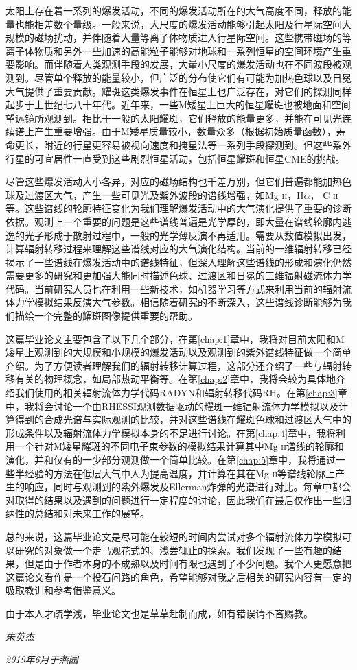 
太阳上存在着一系列的爆发活动，不同的爆发活动所在的大气高度不同，释放的能量也能相差数个量级。一般来说，大尺度的爆发活动能够引起太阳及行星际空间大规模的磁场扰动，并伴随着大量等离子体物质进入行星际空间。这些携带磁场的等离子体物质和另外一些加速的高能粒子能够对地球和一系列恒星的空间环境产生重要影响。而伴随着人类观测手段的发展，大量小尺度的爆发活动也在不同波段被观测到。尽管单个释放的能量较小，但广泛的分布使它们有可能为加热色球以及日冕大气提供了重要贡献。耀斑这类爆发事件在恒星上也广泛存在，对它们的探测同样起步于上世纪七八十年代。近年来，一些M矮星上巨大的恒星耀斑也被地面和空间望远镜所观测到。相比于一般的太阳耀斑，它们释放的能量更多，并能在可见光连续谱上产生重要增强。由于M矮星质量较小，数量众多（根据初始质量函数），寿命更长，附近的行星更容易被视向速度和掩星法等一系列手段探测到。但这些系外行星的可宜居性一直受到这些剧烈恒星活动，包括恒星耀斑和恒星CME的挑战。

尽管这些爆发活动大小各异，对应的磁场结构也千差万别，但它们普遍都能加热色球及过渡区大气，产生一些可见光及紫外波段的谱线增强，如Mg \textsc{ii}，H$\alpha$， C \textsc{ii}等。这些谱线的轮廓特征变化为我们理解爆发活动中的大气演化提供了重要的诊断依据。观测上一个重要的问题是这些谱线普遍是光学厚的，即大量在谱线轮廓内逃逸的光子形成于散射过程中，一般的光学薄反演不再适用。需要从数值模拟出发，计算辐射转移过程来理解这些谱线对应的大气演化结构。当前的一维辐射转移已经揭示了一些谱线在爆发活动中的谱线特征，但深入理解这些谱线的形成和演化仍然需要更多的研究和更加强大能同时描述色球、过渡区和日冕的三维辐射磁流体力学代码。当前研究人员也在利用一些新技术，如机器学习等方式来利用当前的辐射流体力学模拟结果反演大气参数。相信随着研究的不断深入，这些谱线诊断能够为我们描绘一个完整的耀斑图像提供重要的帮助。

这篇毕业论文主要包含了以下几个部分，在第\ref{chap:1}章中，我将对目前太阳和M矮星上观测到的大规模和小规模的爆发活动以及观测到的紫外谱线特征做一个简单介绍。为了方便读者理解我们的辐射转移计算过程，这部分还介绍了一些与辐射转移有关的物理概念，如局部热动平衡等。在第\ref{chap:2}章中，我将会较为具体地介绍我们使用的相关辐射流体力学代码RADYN和辐射转移代码RH。在第\ref{chap:3}章中，我将会讨论一个由RHESSI观测数据驱动的耀斑一维辐射流体力学模拟以及计算得到的合成光谱与实际观测的比较，并对这些谱线在耀斑色球和过渡区大气中的形成条件以及辐射流体力学模拟本身的不足进行讨论。在第\ref{chap:4}章中，我将利用一个针对M矮星耀斑的不同电子束参数的模拟结果计算其中Mg \textsc{ii}谱线的轮廓和演化，并和仅有的一少部分观测做一个简单比较。在第\ref{chap:5}章中，我将通过一些半经验的方法在低层大气中人为提高温度，并计算在其在Mg \textsc{ii}等谱线轮廓上产生的响应，同时与观测到的紫外爆发及Ellerman炸弹的光谱进行对比。每章中都会对取得的结果以及遇到的问题进行一定程度的讨论，因此我们在最后仅作出一些归纳性的总结和对未来工作的展望。

总的来说，这篇毕业论文是尽可能在较短的时间内尝试对多个辐射流体力学模拟可以研究的对象做一个走马观花式的、浅尝辄止的探索。我们发现了一些有趣的结果，但是由于作者本身的不成熟以及时间有限也遇到了不少问题。我个人更愿意把这篇论文看作是一个投石问路的角色，希望能够对我之后相关的研究内容有一定的吸取教训和参考借鉴意义。

由于本人才疏学浅，毕业论文也是草草赶制而成，如有错误请不吝赐教。

\begin{flushright}
	\emph{朱英杰} 
	
	\emph{2019年6月于燕园}
\end{flushright}



